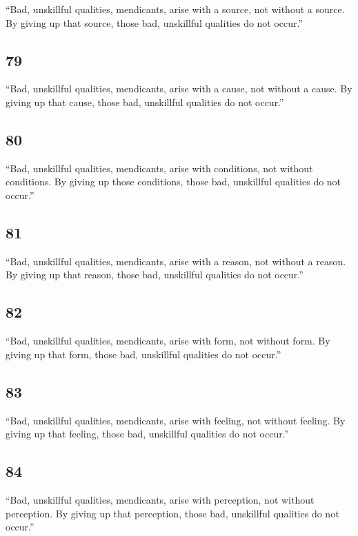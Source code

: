 \documentclass[12pt,openany]{book}%
\begin{document}
“Bad, unskillful qualities, mendicants, arise with a source, not without a source. By giving up that source, those bad, unskillful qualities do not occur.” 

\subsection*{79 }

“Bad, unskillful qualities, mendicants, arise with a cause, not without a cause. By giving up that cause, those bad, unskillful qualities do not occur.” 

\subsection*{80 }

“Bad, unskillful qualities, mendicants, arise with conditions, not without conditions. By giving up those conditions, those bad, unskillful qualities do not occur.” 

\subsection*{81 }

“Bad, unskillful qualities, mendicants, arise with a reason, not without a reason. By giving up that reason, those bad, unskillful qualities do not occur.” 

\subsection*{82 }

“Bad, unskillful qualities, mendicants, arise with form, not without form. By giving up that form, those bad, unskillful qualities do not occur.” 

\subsection*{83 }

“Bad, unskillful qualities, mendicants, arise with feeling, not without feeling. By giving up that feeling, those bad, unskillful qualities do not occur.” 

\subsection*{84 }

“Bad, unskillful qualities, mendicants, arise with perception, not without perception. By giving up that perception, those bad, unskillful qualities do not occur.” 
\end{document}

